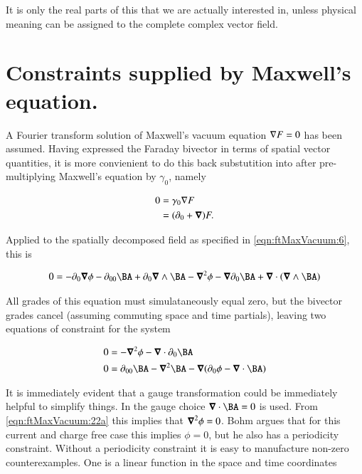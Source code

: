 It is only the real parts of this that we are actually interested in, unless physical meaning can be assigned to the complete complex vector field.

\section{Constraints supplied by Maxwell's equation.}

A Fourier transform solution of Maxwell's vacuum equation $\nabla F = 0$ has been assumed.  Having expressed the Faraday bivector in terms of spatial vector quantities, it is more convienient to do this back substutition into after pre-multiplying Maxwell's equation by $\gamma_0$, namely

\begin{align}
\label{eqn:ftMaxVacuum:20}
0
&= \gamma_0 \nabla F \\
&= (\partial_0 + \boldsymbol{\nabla}) F.
\end{align}

Applied to the spatially decomposed field as specified in \autoref{eqn:ftMaxVacuum:6}, this is

\begin{align*}
0
&=
-\partial_0 \spacegrad \phi
-\partial_{00} \BA
+ \partial_0 \spacegrad \wedge \BA
-\spacegrad^2 \phi
- \spacegrad \partial_0 \BA
+ \spacegrad \cdot (\spacegrad \wedge \BA ) \\
\end{align*}

All grades of this equation must simulataneously equal zero, but the bivector grades cancel (assuming commuting space and time partials), leaving two equations of constraint for the system

\begin{subequations}
\label{eqn:ftMaxVacuum:22}
\begin{align}
0 &=
-\spacegrad^2 \phi - \spacegrad \cdot \partial_0 \BA
\label{eqn:ftMaxVacuum:22a}
\\
0 &=
\partial_{00} \BA - \spacegrad^2 \BA
- \spacegrad (\partial_0 \phi - \spacegrad \cdot \BA )
\label{eqn:ftMaxVacuum:22b}
\end{align}
\end{subequations}

It is immediately evident that a gauge transformation could be immediately helpful to simplify things.  In \cite{bohm1989qt} the gauge choice $\spacegrad \cdot \BA = 0$ is used.  From \autoref{eqn:ftMaxVacuum:22a} this implies that $\boldsymbol{\nabla}^2 \phi = 0$.  Bohm argues that for this current and charge free case this implies $\phi = 0$, but he also has a periodicity constraint.  Without a periodicity constraint it is easy to manufacture non-zero counterexamples.  One is a linear function in the space and time coordinates

